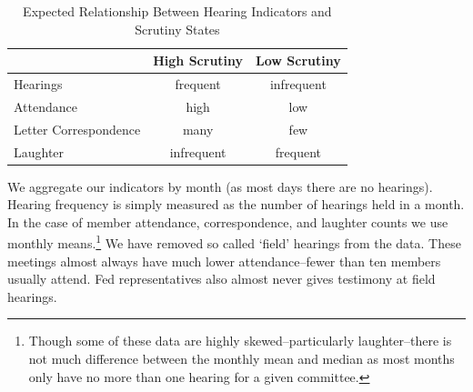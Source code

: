 \documentclass[a4paper]{article}\usepackage[]{graphicx}\usepackage[]{color}
\begin{document}
\begin{table}
    \caption{Expected Relationship Between Hearing Indicators and Scrutiny States}
    \label{ExpectedTable}
    \begin{center}
        \begin{tabular}{l | c c}
            \hline
            & High Scrutiny & Low Scrutiny \\
            \hline \hline
            Hearings & frequent & infrequent \\[0.25cm]
            Attendance & high & low \\[0.25cm]
            Letter Correspondence & many & few \\[0.25cm]
            Laughter & infrequent & frequent \\
            \hline
        \end{tabular}
    \end{center}
\end{table}

We aggregate our indicators by month (as most days there are no hearings). Hearing frequency is simply measured as the number of hearings held in a month. In the case of member attendance, correspondence, and laughter counts we use monthly means.\footnote{Though some of these data are highly skewed--particularly laughter--there is not much difference between the monthly mean and median as most months only have no more than one hearing for a given committee.} We have removed so called `field' hearings from the data. These meetings almost always have much lower attendance--fewer than ten members usually attend. Fed representatives also almost never gives testimony at field hearings.
\end{document}
